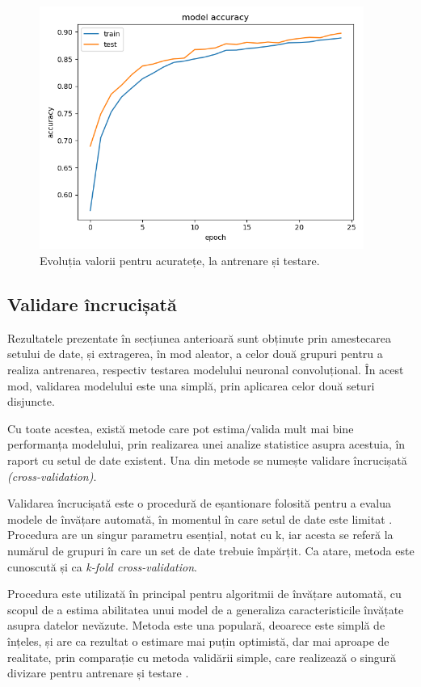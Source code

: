 \documentclass[a4paper,12pt]{report}
\begin{document}
\begin{figure}[h!]
    \centering
    \includegraphics[width=10.6cm]{..//resources//images//model_accuracy.png} 
    \caption{Evoluția valorii pentru acuratețe, la antrenare și testare.}
\end{figure}
\fi


\subsection{Validare încrucișată}
Rezultatele prezentate în secțiunea anterioară sunt obținute prin 
amestecarea setului de date, și extragerea, în mod aleator, a celor 
două grupuri pentru a realiza antrenarea, respectiv testarea modelului 
neuronal convoluțional. În acest mod, validarea modelului este una simplă,
prin aplicarea celor două seturi disjuncte. 

Cu toate acestea, există metode care pot estima/valida mult mai bine 
performanța modelului, prin realizarea unei analize statistice 
asupra acestuia, în raport cu setul de date existent. 
Una din metode se numește validare încrucișată 
\emph{(cross-validation)}.

Validarea încrucișată este o procedură de eșantionare 
folosită pentru a evalua modele de învățare automată, 
în momentul în care setul de date este limitat \cite{WEBSITE:k-fold-cross-validation}.
Procedura are un singur parametru esențial, notat cu k, iar 
acesta se referă la numărul de grupuri în care un set 
de date trebuie împărțit. Ca atare, metoda este cunoscută
și ca \emph{k-fold cross-validation}.

Procedura este utilizată în principal pentru algoritmii 
de învățare automată, cu scopul de a estima abilitatea 
unui model de a generaliza caracteristicile învățate 
asupra datelor nevăzute. 
Metoda este una populară, deoarece
este simplă de înțeles, și are ca rezultat o estimare 
mai puțin optimistă, dar mai aproape de realitate, prin comparație 
cu metoda validării simple, care realizează o singură divizare 
pentru antrenare și testare \cite{WEBSITE:k-fold-cross-validation}.
\end{document}
